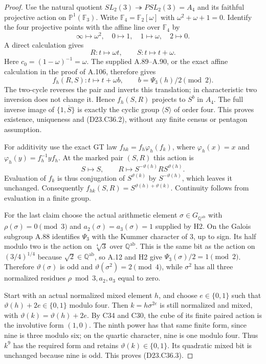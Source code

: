 \begin{proof}
Use the natural quotient
$SL_2(3)\twoheadrightarrow PSL_2(3)=A_4$ and its faithful
projective action on $\mathbb P^1(\mathbb F_3)$. Write
$\mathbb F_4=\mathbb F_2[\omega]$ with
$\omega^2+\omega+1=0$. Identify the four projective points
with the affine line over $\mathbb F_4$ by
\[
 \infty\longmapsto\omega^2,\quad
 0\longmapsto1,\quad
 1\longmapsto\omega,\quad
 2\longmapsto0.
\tag{D23.C36.4}
\]
A direct calculation gives
\[
             R:t\longmapsto\omega t,
             \qquad S:t\longmapsto t+\omega.
\]
Here $c_0=(1-\omega)^{-1}=\omega$. The supplied A.89--A.90,
or the exact affine calculation in the proof of A.106,
therefore gives
\[
 f_h(R,S):t\longmapsto t+\omega b,
 \qquad b=\Psi_3(h)/2\pmod2.
\]
The two-cycle reverses the pair and inverts this translation;
in characteristic two inversion does not change it. Hence
$f_h(S,R)$ projects to $S^b$ in $A_4$. The full inverse image
of $\{1,\overline S\}$ is exactly the cyclic group
$\langle S\rangle$ of order four. This proves existence,
uniqueness and (D23.C36.2), without any finite census or
pentagon assumption.

For additivity use the exact GT law
$f_{hk}=f_h\varphi_h(f_k)$, where
$\varphi_h(x)=x$ and $\varphi_h(y)=f_h^{-1}yf_h$.
At the marked pair $(S,R)$ this action is
\[
 S\longmapsto S,\qquad
 R\longmapsto S^{-\vartheta(h)}RS^{\vartheta(h)}.
\]
Evaluation of $f_k$ is thus conjugation of
$S^{\vartheta(k)}$ by $S^{-\vartheta(h)}$, which leaves it
unchanged. Consequently
$f_{hk}(S,R)=S^{\vartheta(h)+\vartheta(k)}$.
Continuity follows from evaluation in a finite group.

For the last claim choose the actual arithmetic element
$\sigma\in G_{\mathbb Q^{\mathrm{ab}}}$ with
$\rho(\sigma)=0\pmod3$ and
$a_2(\sigma)=a_3(\sigma)=1$ supplied by H2. On the Galois
subgroup A.88 identifies $\Psi_3$ with the Kummer character
of $3$, up to sign. Its half modulo two is the action on
$\sqrt[4]{3}$ over $\mathbb Q^{\mathrm{ab}}$. This is the
same bit as the action on $(3/4)^{1/4}$ because
$\sqrt2\in\mathbb Q^{\mathrm{ab}}$, so A.12 and H2 give
$\Psi_3(\sigma)/2=1\pmod2$. Therefore
$\vartheta(\sigma)$ is odd and
$\vartheta(\sigma^2)=2\pmod4$, while $\sigma^2$ has all
three normalized residues $\rho\bmod3,a_2,a_3$ equal to zero.

Start with an actual normalized mixed element $h$, and
choose $e\in\{0,1\}$ such that
$\vartheta(h)+2e\in\{0,1\}$ modulo four. Then
$k=h\sigma^{2e}$ is still normalized and mixed, with
$\vartheta(k)=\vartheta(h)+2e$. By C34 and C30, the cube
of its finite paired action is the involutive form $(1,0)$.
The ninth power has that same finite form, since nine is
three modulo six; on the quartic character, nine is one
modulo four. Thus $k^9$ has the required form and retains
$\vartheta(k)\in\{0,1\}$. Its quadratic mixed bit is
unchanged because nine is odd. This proves (D23.C36.3).
\end{proof}

